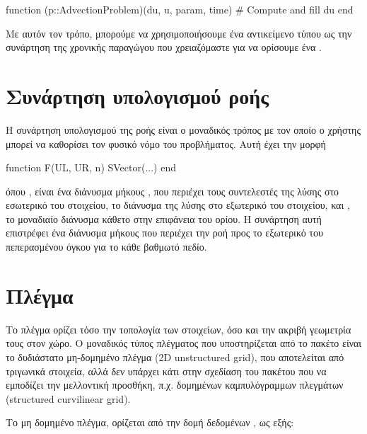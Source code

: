 {\large
\begin{jllisting}[language=julia,style=jlcodestyle]
function (p::AdvectionProblem)(du, u, param, time)
    # Compute and fill du
end
\end{jllisting}
}

Με αυτόν τον τρόπο, μπορούμε να χρησιμοποιήσουμε ένα αντικείμενο τύπου  ως την συνάρτηση της χρονικής παραγώγου που χρειαζόμαστε για να ορίσουμε ένα .

\section{Συνάρτηση υπολογισμού ροής}

Η συνάρτηση υπολογισμού της ροής είναι ο μοναδικός τρόπος με τον οποίο ο χρήστης μπορεί να καθορίσει τον φυσικό νόμο του προβλήματος.
Αυτή έχει την μορφή

{\large
\begin{jllisting}[language=julia,style=jlcodestyle]
function F(UL, UR, n)
    SVector(...)
end
\end{jllisting}
}

όπου , είναι ένα διάνυσμα μήκους , που περιέχει τους συντελεστές της λύσης στο εσωτερικό του στοιχείου,  το διάνυσμα της λύσης στο εξωτερικό του στοιχείου, και , το μοναδιαίο διάνυσμα κάθετο στην επιφάνεια του ορίου.
Η συνάρτηση αυτή επιστρέφει ένα διάνυσμα μήκους  που περιέχει την ροή προς το εξωτερικό του πεπερασμένου όγκου για το κάθε βαθμωτό πεδίο.

\section{Πλέγμα}

Το πλέγμα ορίζει τόσο την τοπολογία των στοιχείων, όσο και την ακριβή γεωμετρία τους στον χώρο.
Ο μοναδικός τύπος πλέγματος που υποστηρίζεται από το πακέτο είναι το δυδιάστατο μη-δομημένο πλέγμα (2D unstructured grid), που αποτελείται από τριγωνικά στοιχεία, αλλά δεν υπάρχει κάτι στην σχεδίαση του πακέτου που να εμποδίζει την μελλοντική προσθήκη, π.χ. δομημένων καμπυλόγραμμων πλεγμάτων (structured curvilinear grid).

Το μη δομημένο πλέγμα, ορίζεται από την δομή δεδομένων , ως εξής:

